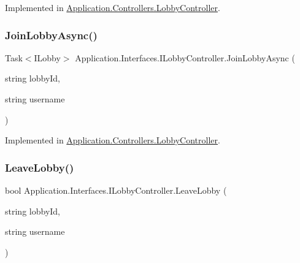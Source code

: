 Implemented in \mbox{\hyperlink{class_application_1_1_controllers_1_1_lobby_controller_ac081cab03ea49323b57c294ca95c6a09}{Application.\+Controllers.\+Lobby\+Controller}}.

\mbox{\label{interface_application_1_1_interfaces_1_1_i_lobby_controller_aba87a2245b2c274cf977aeaf193eef73}} 
\subsubsection{\texorpdfstring{Join\+Lobby\+Async()}{JoinLobbyAsync()}}
{\footnotesize\ttfamily Task$<$I\+Lobby$>$ Application.\+Interfaces.\+I\+Lobby\+Controller.\+Join\+Lobby\+Async (\begin{DoxyParamCaption}\item[{string}]{lobby\+Id,  }\item[{string}]{username }\end{DoxyParamCaption})}



Implemented in \mbox{\hyperlink{class_application_1_1_controllers_1_1_lobby_controller_af9484a4c054717c0975175d93e45149c}{Application.\+Controllers.\+Lobby\+Controller}}.

\mbox{\label{interface_application_1_1_interfaces_1_1_i_lobby_controller_ad95e5c656813094f7abec7b81ea568e1}} 
\subsubsection{\texorpdfstring{Leave\+Lobby()}{LeaveLobby()}}
{\footnotesize\ttfamily bool Application.\+Interfaces.\+I\+Lobby\+Controller.\+Leave\+Lobby (\begin{DoxyParamCaption}\item[{string}]{lobby\+Id,  }\item[{string}]{username }\end{DoxyParamCaption})}



